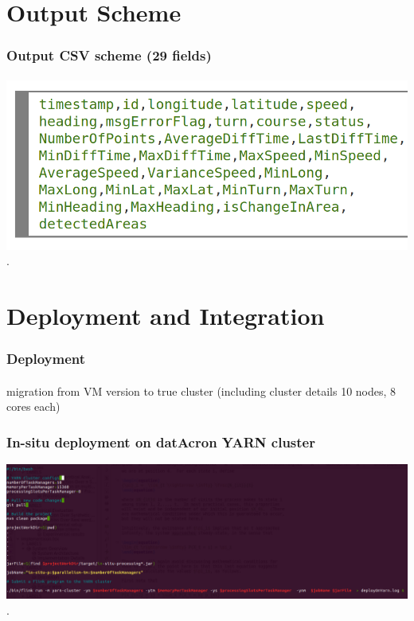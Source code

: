 \section{Output Scheme}		
\frame
{		
\frametitle{Output CSV scheme (29 fields)}
\framesubtitle{}

\begin{center}
	\includegraphics[scale=.32,left]{figures/insitu_output.png}\\
	.
\end{center}

}


\section{Deployment and Integration }
\frame
{	
	\frametitle{Deployment}
	\framesubtitle{}
migration from VM version to true cluster (including cluster details 10 nodes, 8 cores each)
}



\frame
{	
	\frametitle{In-situ deployment on datAcron YARN cluster}

	\begin{center}
		\includegraphics[width=.7\textwidth,height=.5\linewidth]{figures/deploy.png}
		.
	\end{center}
}



